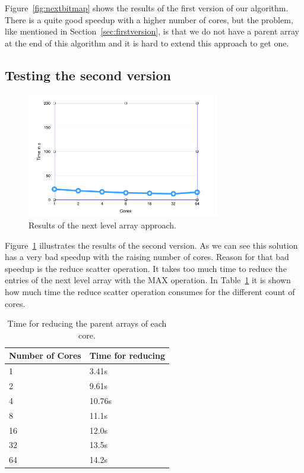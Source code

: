 \documentclass[12pt,a4paper]{article}
\begin{document}
Figure~\ref{fig:nextbitmap} shows the results of the first version of our algorithm. There is a quite good speedup with a higher number of cores, but the problem, like mentioned in Section~\ref{sec:firstversion}, is that we do not have a parent array at the end of this algorithm and it is hard to extend this approach to get one.

\subsection{Testing the second version}

\begin{figure}[!ht]
   \centering
   \includegraphics[width=0.75\textwidth]{parent_array}
   \caption{Results of the next level array approach.}
   \label{fig:parentarray}
\end{figure}

Figure~\ref{fig:parentarray} illustrates the results of the second version. As we can see this solution has a very bad speedup with the raising number of cores. Reason for that bad speedup is the reduce scatter operation. It takes too much time to reduce the entries of the next level array with the MAX operation. In Table~\ref{tab:reducescatter} it is shown how much time the reduce scatter operation consumes for the different count of cores.

\begin{table}[!ht]
	\centering
	\begin{tabular}{ | l | l |}
  		\hline
  		Number of Cores & Time for reducing \\ \hline
  		1 & 3.41s \\ \hline
		2 & 9.61s \\ \hline
		4 & 10.76s \\ \hline
		8 & 11.1s \\ \hline
		16 & 12.0s \\ \hline
		32 & 13.5s \\ \hline
		64 & 14.2s \\ \hline
	\end{tabular}
	\caption{Time for reducing the parent arrays of each core.}
  	\label{tab:reducescatter}
\end{table}
\end{document}

